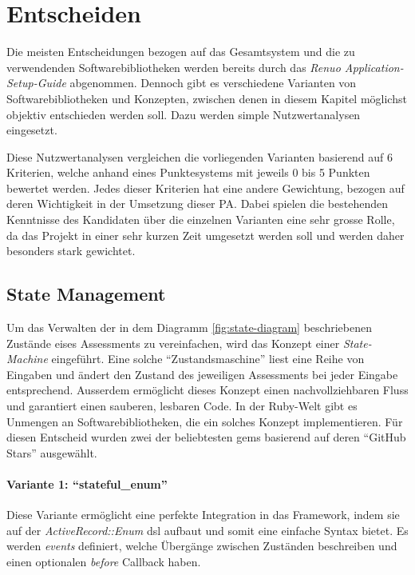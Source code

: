 \chapter{Entscheiden} \label{ch:decide}

Die meisten Entscheidungen bezogen auf das Gesamtsystem und die zu verwendenden Softwarebibliotheken werden bereits durch das
\emph{Renuo Application-Setup-Guide} abgenommen. Dennoch gibt es verschiedene Varianten von Softwarebibliotheken und Konzepten,
zwischen denen in diesem Kapitel möglichst objektiv entschieden werden soll. Dazu werden simple Nutzwertanalysen eingesetzt.

Diese Nutzwertanalysen vergleichen die vorliegenden Varianten basierend auf 6 Kriterien, welche anhand eines Punktesystems mit jeweils 0 bis 5 Punkten bewertet werden.
Jedes dieser Kriterien hat eine andere Gewichtung, bezogen auf deren Wichtigkeit in der Umsetzung dieser PA.
Dabei spielen die bestehenden Kenntnisse des Kandidaten über die einzelnen Varianten eine sehr grosse Rolle,
da das Projekt in einer sehr kurzen Zeit umgesetzt werden soll und werden daher besonders stark gewichtet.

\section{State Management}
Um das Verwalten der in dem Diagramm \ref{fig:state-diagram} beschriebenen Zustände eises Assessments zu vereinfachen,
wird das Konzept einer \emph{State-Machine} eingeführt. Eine solche \enquote{Zustandsmaschine} liest eine Reihe von Eingaben
und ändert den Zustand des jeweiligen Assessments bei jeder Eingabe entsprechend. Ausserdem ermöglicht dieses Konzept einen nachvollziehbaren
Fluss und garantiert einen sauberen, lesbaren Code. In der Ruby-Welt gibt es Unmengen an Softwarebibliotheken, die ein solches Konzept implementieren.
Für diesen Entscheid wurden zwei der beliebtesten gems basierend auf deren \enquote{GitHub Stars} ausgewählt.

\subsubsection{Variante 1: \enquote{stateful\_enum}}

Diese Variante ermöglicht eine perfekte Integration in das Framework, indem sie auf der \emph{ActiveRecord::Enum} \gls{dsl} aufbaut und somit eine einfache Syntax bietet.
Es werden \emph{events} definiert, welche Übergänge zwischen Zuständen beschreiben und einen optionalen \emph{before} Callback haben.

